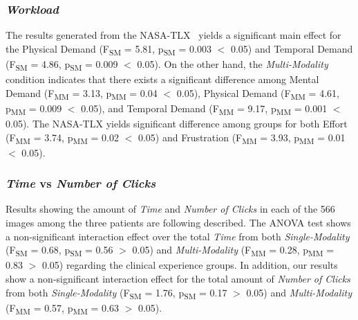 
\subsubsection{\textit{Workload}}

The results generated from the NASA-TLX~\cite{10.1145/3290605.3300592} yields a significant main effect for the Physical Demand (F\textsubscript{SM} = 5.81, p\textsubscript{SM} = 0.003 $<$ 0.05) and Temporal Demand (F\textsubscript{SM} = 4.86, p\textsubscript{SM} = 0.009 $<$ 0.05).
On the other hand, the \textit{Multi-Modality} condition indicates that there exists a significant difference among Mental Demand (F\textsubscript{MM} = 3.13, p\textsubscript{MM} = 0.04 $<$ 0.05), Physical Demand (F\textsubscript{MM} = 4.61, p\textsubscript{MM} = 0.009 $<$ 0.05), and Temporal Demand (F\textsubscript{MM} = 9.17, p\textsubscript{MM} = 0.001 $<$ 0.05).
The NASA-TLX yields significant difference among groups for both Effort (F\textsubscript{MM} = 3.74, p\textsubscript{MM} = 0.02 $<$ 0.05) and Frustration (F\textsubscript{MM} = 3.93, p\textsubscript{MM} = 0.01 $<$ 0.05).

\balance

\subsubsection{\textit{Time} vs \textit{Number of Clicks}}

Results showing the amount of \textit{Time} and \textit{Number of Clicks} in each of the 566 images among the three patients are following described.
The ANOVA test shows a non-significant interaction effect over the total \textit{Time} from both \textit{Single-Modality} (F\textsubscript{SM} = 0.68, p\textsubscript{SM} = 0.56 $>$ 0.05) and \textit{Multi-Modality} (F\textsubscript{MM} = 0.28, p\textsubscript{MM} = 0.83 $>$ 0.05) regarding the clinical experience groups.
In addition, our results show a non-significant interaction effect for the total amount of \textit{Number of Clicks} from both \textit{Single-Modality} (F\textsubscript{SM} = 1.76, p\textsubscript{SM} = 0.17 $>$ 0.05) and \textit{Multi-Modality} (F\textsubscript{MM} = 0.57, p\textsubscript{MM} = 0.63 $>$ 0.05).

